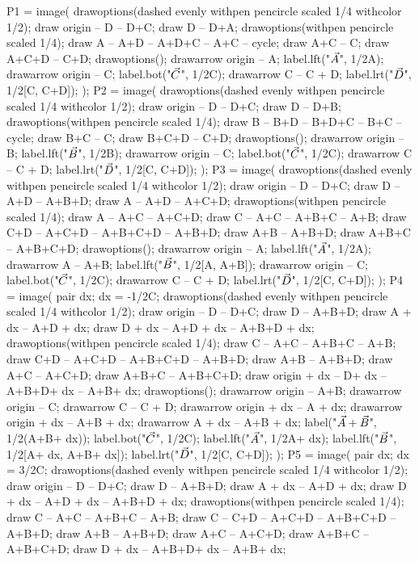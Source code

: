 \documentclass[oneside]{scrbook}
\begin{document}
P1 = image(
drawoptions(dashed evenly withpen pencircle scaled 1/4 withcolor 1/2);
draw origin -- D -- D+C;  draw D -- D+A;
drawoptions(withpen pencircle scaled 1/4);
draw A -- A+D -- A+D+C -- A+C -- cycle;
draw A+C -- C;
draw A+C+D -- C+D;
drawoptions();
drawarrow origin -- A; label.lft("$\vec{A}$", 1/2A);
drawarrow origin -- C; label.bot("$\vec{C}$", 1/2C);
drawarrow C -- C + D; label.lrt("$\vec{D}$", 1/2[C, C+D]);
);
P2 = image(
drawoptions(dashed evenly withpen pencircle scaled 1/4 withcolor 1/2);
draw origin -- D -- D+C;  draw D -- D+B;
drawoptions(withpen pencircle scaled 1/4);
draw B -- B+D -- B+D+C -- B+C -- cycle;
draw B+C -- C;
draw B+C+D -- C+D;
drawoptions();
drawarrow origin -- B; label.lft("$\vec{B}$", 1/2B);
drawarrow origin -- C; label.bot("$\vec{C}$", 1/2C);
drawarrow C -- C + D; label.lrt("$\vec{D}$", 1/2[C, C+D]);
);
P3 = image(
drawoptions(dashed evenly withpen pencircle scaled 1/4 withcolor 1/2);
draw origin -- D -- D+C;  
draw D -- A+D -- A+B+D;
draw A -- A+D -- A+C+D;
drawoptions(withpen pencircle scaled 1/4);
draw A -- A+C -- A+C+D;
draw C -- A+C -- A+B+C -- A+B;
draw C+D -- A+C+D -- A+B+C+D -- A+B+D;
draw A+B -- A+B+D;
draw A+B+C -- A+B+C+D;
drawoptions();
drawarrow origin -- A; label.lft("$\vec{A}$", 1/2A);
drawarrow A -- A+B; label.lft("$\vec{B}$", 1/2[A, A+B]);
drawarrow origin -- C; label.bot("$\vec{C}$", 1/2C);
drawarrow C -- C + D; label.lrt("$\vec{D}$", 1/2[C, C+D]);
);
P4 = image(
pair dx; dx = -1/2C;
drawoptions(dashed evenly withpen pencircle scaled 1/4 withcolor 1/2);
draw origin -- D -- D+C;  
draw D -- A+B+D;
draw A + dx -- A+D + dx;
draw D + dx -- A+D + dx -- A+B+D + dx;
drawoptions(withpen pencircle scaled 1/4);
draw C -- A+C -- A+B+C -- A+B;
draw C+D -- A+C+D -- A+B+C+D -- A+B+D;
draw A+B -- A+B+D;
draw A+C -- A+C+D;
draw A+B+C -- A+B+C+D;
draw origin + dx -- D+ dx -- A+B+D+ dx -- A+B+ dx;
drawoptions();
drawarrow origin -- A+B;
drawarrow origin -- C;
drawarrow C -- C + D; 
drawarrow origin + dx -- A + dx; 
drawarrow origin + dx -- A+B + dx; 
drawarrow A + dx -- A+B + dx;
label("$\vec{A}+\vec{B}$", 1/2(A+B+ dx));
label.bot("$\vec{C}$", 1/2C);
label.lft("$\vec{A}$", 1/2A+ dx);
label.lft("$\vec{B}$", 1/2[A+ dx, A+B+ dx]);
label.lrt("$\vec{D}$", 1/2[C, C+D]);
);
P5 = image(
pair dx; dx = 3/2C;
drawoptions(dashed evenly withpen pencircle scaled 1/4 withcolor 1/2);
draw origin -- D -- D+C;  
draw D -- A+B+D;
draw A + dx -- A+D + dx;
draw D + dx -- A+D + dx -- A+B+D + dx;
drawoptions(withpen pencircle scaled 1/4);
draw C -- A+C -- A+B+C -- A+B;
draw C -- C+D -- A+C+D -- A+B+C+D -- A+B+D;
draw A+B -- A+B+D;
draw A+C -- A+C+D;
draw A+B+C -- A+B+C+D;
draw D + dx -- A+B+D+ dx -- A+B+ dx;
\end{document}
